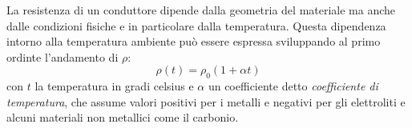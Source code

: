 La resistenza di un conduttore dipende dalla geometria del materiale ma anche dalle condizioni fisiche e
in particolare dalla temperatura. Questa dipendenza intorno alla temperatura ambiente può essere
espressa sviluppando al primo ordinte l'andamento di $\rho$:
\[
    \rho(t)=\rho_0(1+\alpha t)
\]
con $t$ la temperatura in gradi celsius e $\alpha$ un coefficiente detto \textit{coefficiente di temperatura}, che assume
valori positivi per i metalli e negativi per gli elettroliti e alcuni materiali non metallici come il carbonio.

